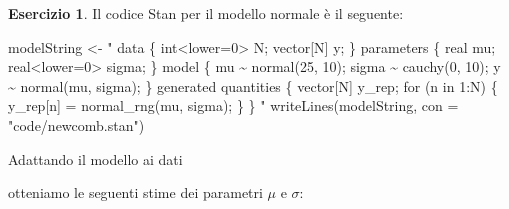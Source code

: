 \documentclass[
  11pt,
]{krantz}
\makeatletter
\newenvironment{Shaded}{\begin{snugshade}}{\end{snugshade}}
\newcommand{\AttributeTok}[1]{\textcolor[rgb]{0.61,0.61,0.61}{#1}}
\newcommand{\DecValTok}[1]{\textcolor[rgb]{0.06,0.06,0.06}{#1}}
\newcommand{\FunctionTok}[1]{\textcolor[rgb]{0,0,0}{#1}}
\newcommand{\NormalTok}[1]{#1}
\newcommand{\OtherTok}[1]{\textcolor[rgb]{0.37,0.37,0.37}{#1}}
\newcommand{\SpecialCharTok}[1]{\textcolor[rgb]{0,0,0}{#1}}
\newcommand{\StringTok}[1]{\textcolor[rgb]{0.5,0.5,0.5}{#1}}
\newenvironment{kframe}{%
\medskip{}
\setlength{\fboxsep}{.8em}
 \def\at@end@of@kframe{}%
 \ifinner\ifhmode%
  \def\at@end@of@kframe{\end{minipage}}%
  \begin{minipage}{\columnwidth}%
 \fi\fi%
 \def\FrameCommand##1{\hskip\@totalleftmargin \hskip-\fboxsep
 \colorbox{shadecolor}{##1}\hskip-\fboxsep
     \hskip-\linewidth \hskip-\@totalleftmargin \hskip\columnwidth}%
 \MakeFramed {\advance\hsize-\width
   \@totalleftmargin\z@ \linewidth\hsize
   \@setminipage}}%
 {\par\unskip\endMakeFramed%
 \at@end@of@kframe}
\renewenvironment{Shaded}{\begin{kframe}}{\end{kframe}}
\theoremstyle{definition}
\theoremstyle{definition}
\theoremstyle{definition}
\newtheorem{exercise}{Esercizio}[chapter]
\theoremstyle{definition}
\theoremstyle{remark}
\makeatother
\begin{document}
\begin{exercise}
Il codice Stan per il modello normale è il seguente:

\begin{Shaded}
\begin{Highlighting}[]
\NormalTok{modelString }\OtherTok{\textless{}{-}} \StringTok{"}
\StringTok{data \{}
\StringTok{  int\textless{}lower=0\textgreater{} N;}
\StringTok{  vector[N] y;}
\StringTok{\}}
\StringTok{parameters \{}
\StringTok{  real mu;}
\StringTok{  real\textless{}lower=0\textgreater{} sigma;}
\StringTok{\}}
\StringTok{model \{}
\StringTok{  mu \textasciitilde{} normal(25, 10);}
\StringTok{  sigma \textasciitilde{} cauchy(0, 10);}
\StringTok{  y \textasciitilde{} normal(mu, sigma);}
\StringTok{\}}
\StringTok{generated quantities \{}
\StringTok{  vector[N] y\_rep;}
\StringTok{  for (n in 1:N) \{}
\StringTok{    y\_rep[n] = normal\_rng(mu, sigma);}
\StringTok{  \}}
\StringTok{\}}
\StringTok{"}
\FunctionTok{writeLines}\NormalTok{(modelString, }\AttributeTok{con =} \StringTok{"code/newcomb.stan"}\NormalTok{)}
\end{Highlighting}
\end{Shaded}

Adattando il modello ai dati

\begin{Shaded}
\end{Shaded}

otteniamo le seguenti stime dei parametri \(\mu\) e \(\sigma\):


\end{exercise}
\end{document}
